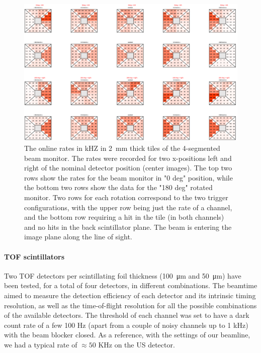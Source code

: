 \begin{refsection}
        \begin{figure}
            \centering
            \includegraphics[width=0.9\linewidth]{Figures/muEDM_Dec2023/BeamMonTriang_scanData2023.png}%
            \caption[muEDM 2023: Beam monitor 4-segments analysis]{The online rates in kHZ in 2~mm thick tiles of the 4-segmented beam monitor. The rates were recorded for two x-positions left and right of the nominal detector position (center images). The top two rows show the rates for the beam monitor in "0 deg" position, while the bottom two rows show the data for the "180 deg" rotated monitor. Two rows for each rotation correspond to the two trigger configurations, with the upper row being just the rate of a channel, and the bottom row requiring a hit in the tile (in both channels) and no hits in the back scintillator plane. The beam is entering the image plane along the line of sight.}
            \label{fig:BeamMonTriang_positionScan}
        \end{figure}

        \paragraph{TOF scintillators}
        Two TOF detectors per scintillating foil thickness (\SI{100}{\micro m} and \SI{50}{\micro m}) have been tested, for a total of four detectors, in different combinations. 
        The beamtime aimed to measure the detection efficiency of each detector and its intrinsic timing resolution, as well as the time-of-flight resolution for all the possible combinations of the available detectors.
        The threshold of each channel was set to have a dark count rate of a few 100 Hz (apart from a couple of noisy channels up to 1 kHz) with the beam blocker closed. 
        As a reference, with the settings of our beamline, we had a typical rate of $\approx50$ KHz on the US detector.


\end{refsection}
